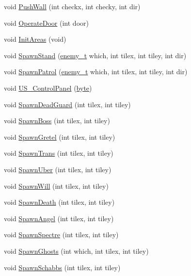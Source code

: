 \begin{DoxyCompactItemize}
\item 
void \hyperlink{WL__DEF_8H_abb884a307f2d10f6e1fc390ae66157bc}{PushWall} (int checkx, int checky, int dir)
\item 
void \hyperlink{WL__DEF_8H_a0169afc52fe92fa36608b9e37b56359c}{OperateDoor} (int door)
\item 
void \hyperlink{WL__DEF_8H_aac1c645485078958d366828ec6b24cad}{InitAreas} (void)
\item 
void \hyperlink{WL__DEF_8H_a50e3fd0352d390adb00570c075e6bb23}{SpawnStand} (\hyperlink{WL__DEF_8H_a170079e8c026d22e4de4683611bc7a50}{enemy\_\-t} which, int tilex, int tiley, int dir)
\item 
void \hyperlink{WL__DEF_8H_ac1bea4e1584964301d418e28f73a2295}{SpawnPatrol} (\hyperlink{WL__DEF_8H_a170079e8c026d22e4de4683611bc7a50}{enemy\_\-t} which, int tilex, int tiley, int dir)
\item 
void \hyperlink{WL__DEF_8H_a70713817c5ea4074fc8d3f6c0f9aadbe}{US\_\-ControlPanel} (\hyperlink{ID__HEAD_8H_a0c8186d9b9b7880309c27230bbb5e69d}{byte})
\item 
void \hyperlink{WL__DEF_8H_a12fd6ce0b8165309130e7a23b2a9ec66}{SpawnDeadGuard} (int tilex, int tiley)
\item 
void \hyperlink{WL__DEF_8H_a08321e86d04e179863c4d221b3c3d4f2}{SpawnBoss} (int tilex, int tiley)
\item 
void \hyperlink{WL__DEF_8H_afa50c190d35b8c0951d7864b104c2d46}{SpawnGretel} (int tilex, int tiley)
\item 
void \hyperlink{WL__DEF_8H_a9f673c74a8c0270b9bdfdddc7f83af26}{SpawnTrans} (int tilex, int tiley)
\item 
void \hyperlink{WL__DEF_8H_a55ec11e3e32b763be3ae4bdddb27f766}{SpawnUber} (int tilex, int tiley)
\item 
void \hyperlink{WL__DEF_8H_aeb637e7d06b607458d4b926e1e97388e}{SpawnWill} (int tilex, int tiley)
\item 
void \hyperlink{WL__DEF_8H_ab7fc7b0ae4a6a8ccdda57599bf4a2ae6}{SpawnDeath} (int tilex, int tiley)
\item 
void \hyperlink{WL__DEF_8H_ab29617b3d9855147626511791f046c80}{SpawnAngel} (int tilex, int tiley)
\item 
void \hyperlink{WL__DEF_8H_a65eefb1987f79d11f5ebb5fd122579d5}{SpawnSpectre} (int tilex, int tiley)
\item 
void \hyperlink{WL__DEF_8H_a1bee4148fbfe5320a96364b8bd910f27}{SpawnGhosts} (int which, int tilex, int tiley)
\item 
void \hyperlink{WL__DEF_8H_a45e5e04ad0e19428f6c6fe0f10ef10c9}{SpawnSchabbs} (int tilex, int tiley)

\end{DoxyCompactItemize}
